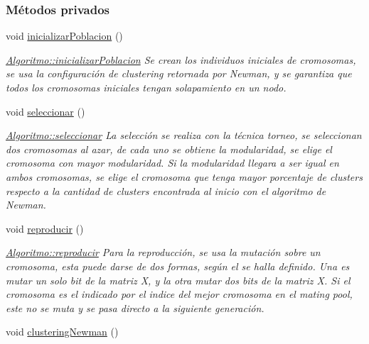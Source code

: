 \subsubsection*{Métodos privados}
\begin{DoxyCompactItemize}
\item 
void \hyperlink{class_algoritmo_a31e6f36a2b008ec1b777f2bea78cdcb9}{inicializar\-Poblacion} ()
\begin{DoxyCompactList}\small\item\em \hyperlink{class_algoritmo_a31e6f36a2b008ec1b777f2bea78cdcb9}{Algoritmo\-::inicializar\-Poblacion} Se crean los individuos iniciales de cromosomas, se usa la configuraci\'{o}n de {\itshape clustering} retornada por Newman, y se garantiza que todos los cromosomas iniciales tengan solapamiento en un nodo. \end{DoxyCompactList}\item 
void \hyperlink{class_algoritmo_a0ea4f57c37e4a6fc36a189b1fb72f2f5}{seleccionar} ()
\begin{DoxyCompactList}\small\item\em \hyperlink{class_algoritmo_a0ea4f57c37e4a6fc36a189b1fb72f2f5}{Algoritmo\-::seleccionar} La selecci\'{o}n se realiza con la t\'{e}cnica torneo, se seleccionan dos cromosomas al azar, de cada uno se obtiene la modularidad, se elige el cromosoma con mayor modularidad. Si la modularidad llegara a ser igual en ambos cromosomas, se elige el cromosoma que tenga mayor porcentaje de {\itshape clusters} respecto a la cantidad de {\itshape clusters} encontrada al inicio con el algoritmo de Newman. \par
 \end{DoxyCompactList}\item 
void \hyperlink{class_algoritmo_ac8d6cb1e51861008c6d50ab9e8b3666a}{reproducir} ()
\begin{DoxyCompactList}\small\item\em \hyperlink{class_algoritmo_ac8d6cb1e51861008c6d50ab9e8b3666a}{Algoritmo\-::reproducir} Para la reproducci\'{o}n, se usa la mutaci\'{o}n sobre un cromosoma, esta puede darse de dos formas, seg\'{u}n el se halla definido. Una es mutar un solo {\itshape bit} de la matriz X, y la otra mutar dos {\itshape bits} de la matriz X. Si el cromosoma es el indicado por el indice del mejor cromosoma en el mating pool, este no se muta y se pasa directo a la siguiente generaci\'{o}n. \end{DoxyCompactList}\item 
void \hyperlink{class_algoritmo_a718fe5e18f1b887a7c10604935664402}{clustering\-Newman} ()

\end{DoxyCompactItemize}
